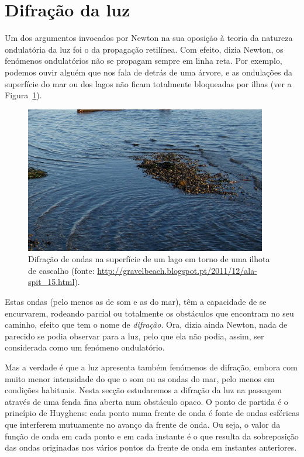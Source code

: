 \section{Difração da luz}
Um dos argumentos invocados por Newton na sua oposição à teoria da natureza
ondulatória da luz foi o da propagação retilínea. Com efeito, dizia Newton, os
fenómenos ondulatórios não se propagam sempre em linha reta. Por exemplo,
podemos ouvir alguém que nos fala de detrás de uma árvore, e as ondulações da
superfície do mar ou dos lagos não ficam totalmente bloqueadas por ilhas (ver a
Figura~\ref{fig:40-070}).
\begin{figure}[htb]
    \begin{center}
        \includegraphics{figs/f40-070.jpg}
        \caption{Difração de ondas na superfície de um lago em torno de
            uma ilhota de cascalho (fonte:
            \protect\url{http://gravelbeach.blogspot.pt/2011/12/ala-spit_15.html}).
        \label{fig:40-070} }
\end{center}
\end{figure}
Estas ondas (pelo menos as de
som e as do mar), têm a capacidade de se encurvarem, rodeando parcial ou
totalmente os obstáculos que encontram no seu caminho, efeito que tem o nome de
\emph{difração}. Ora, dizia ainda Newton, nada de parecido se podia observar
para a luz, pelo que ela não podia, assim, ser considerada como um fenómeno
ondulatório. 

Mas a verdade é que a luz apresenta também fenómenos de difração, embora com
muito menor intensidade do que o som ou as ondas do mar, pelo menos em condições
habituais. Nesta secção estudaremos a difração da luz na passagem através de uma
fenda fina aberta num obstáculo opaco. O ponto de partida é o princípio de
Huyghens: cada ponto numa frente de onda é fonte de ondas esféricas que
interferem mutuamente no avanço da frente de onda. Ou seja, o valor da função de
onda em cada ponto e em cada instante é o que resulta da sobreposição das ondas
originadas nos vários pontos da frente de onda em instantes anteriores.

